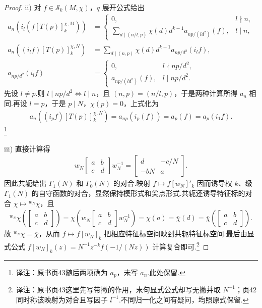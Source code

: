\begin{proof}
ii) 对 $f\in\mathcal S_k(M,\chi)$，$q$ 展开公式给出
\begin{align*}
a_n(i_l(f[T(p)]_k^{\chi,M}))&=\begin{cases}0,&l\nmid n,\\\displaystyle\sum_{d\mid(n/l,p)}\chi(d)d^{k-1}a_{np/(ld^2)}(f),&l\mid n,\end{cases}\\
a_n((i_lf)[T(p)]_k^{\chi,N})&=\sum_{d\mid(n,p)}\chi(d)d^{k-1}a_{np/d^2}(i_lf),\\
a_{np/d^2}(i_lf)&=\begin{cases}0,&l\nmid np/d^2,\\a_{np/(ld^2)}(f),&l\mid np/d^2.\end{cases}
\end{align*}
先设 $l\ne p$.则 $l\mid np/d^2\Longleftrightarrow l\mid n$，且 $(n,p)=(n/l,p)$，于是两种计算所得 $a_n$ 相同.再设 $l=p$，于是 $p\mid N$，$\chi(p)=0$，上式化为
\begin{align*}
a_n((i_pf)[T(p)]_k^{\chi,N})=a_{np}(i_p(f))=a_p(f)=a_p(i_1f).
\end{align*}
\footnote{译注：原书页43随后两项确为 $a_p$，未写 $a_n$.此处保留.}

iii) 直接计算得
\begin{align*}
w_N\begin{bmatrix}a&b\\c&d\end{bmatrix}w_N^{-1}=\begin{bmatrix}d&-c/N\\-bN&a\end{bmatrix}.
\end{align*}
因此共轭给出 $\Gamma_1(N)$ 和 $\Gamma_0(N)$ 的对合.映射 $f\mapsto f[w_N]'_k$ 因而诱导权 $k$、级 $\Gamma_1(N)$ 的自守函数的对合，显然保持模形式和尖点形式.共轭还诱导特征标的对合 $\chi\mapsto{}^{w_N}\chi$，且
\begin{align*}
{}^{w_N}\chi\left(\begin{bmatrix}a&b\\c&d\end{bmatrix}\right)
=\chi\left(w_N\begin{bmatrix}a&b\\c&d\end{bmatrix}w_N^{-1}\right)=\chi(a)=\overline\chi(d)=\overline\chi\left(\begin{bmatrix}a&b\\c&d\end{bmatrix}\right).
\end{align*}
故 ${}^{w_N}\chi=\overline\chi$，从而 $f\mapsto f[w_N]_k$ 把相应特征标空间映到共轭特征标空间.最后由显式公式 $f[w_N]_k(z)=N^{-1}z^{-k}f(-1/(Nz))$ 计算复合即可.\footnote{译注：原书页43这里先写带撇的作用，末句显式公式却写无撇并取 $N^{-1}$；页42同时称该映射为对合且写因子 $l^{-1}$.不同归一化之间有疑问，均照原式保留.}

\end{proof}

